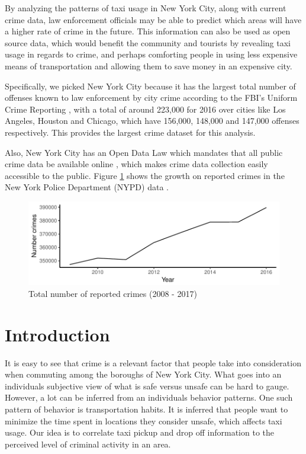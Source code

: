 \documentclass{sigkddExp}
\begin{document}
By analyzing the patterns of taxi usage in New York City, along with current crime data, law enforcement officials may be able to predict which areas will have a higher rate of crime in the future. This information can also be used as open source data, which would benefit the community and tourists by revealing taxi usage in regards to crime, and perhaps comforting people in using less expensive means of transportation and allowing them to save money in an expensive city.  

Specifically, we picked New York City because it has the largest total number of offenses known to law enforcement by city crime according to the FBI's Uniform Crime Reporting \cite{fbiUniformCrime}, with a total of around 223,000 for 2016 over cities like Los Angeles, Houston and Chicago, which have 156,000, 148,000 and
147,000 offenses respectively. 
This provides the largest crime dataset for this analysis.

Also, New York City has an Open Data Law which mandates that all public crime data be available online \cite{OpenDat}, which makes crime data collection easily accessible to the public. Figure \ref{total_crimes} shows the growth on reported crimes in the New York Police Department (NYPD) data \cite{NYPDHis}.

\begin{figure}
\caption{Total number of reported crimes (2008 - 2017)}
\label{total_crimes}
\centering \includegraphics[width=.45\textwidth]{../img/total_crimes.pdf}
\end{figure}


\section{Introduction}

It is easy to see that crime is a relevant factor that people take into consideration when commuting among the boroughs of New York City. 
What goes into an individuals subjective view of what is safe versus unsafe can be hard to gauge. However, a lot can be inferred from an individuals behavior patterns.
One such pattern of behavior is transportation habits. It is inferred that people want to minimize the time spent in locations they consider unsafe, which affects taxi usage. Our idea is to correlate taxi pickup and drop off information to the perceived level of criminal activity in an area. 
\end{document}
